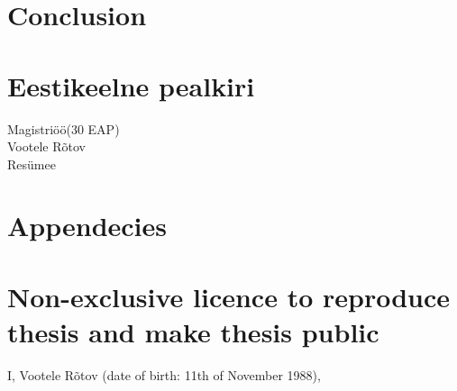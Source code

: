 \documentclass{style/master-thesis}
\begin{document}
\clearpage
\section{Conclusion} 



\newpage


\section{Eestikeelne pealkiri}
Magistriöö(30 EAP) \\
Vootele Rõtov \\
Resümee \\




\newpage

{}


\newpage

\appendix
\section*{Appendecies}
\renewcommand{\thesubsection}{\Alph{subsection}}

\pagebreak
\section*{\small Non-exclusive licence to reproduce thesis and make thesis public}


I, Vootele Rõtov (date of birth: 11th of November 1988),
\end{document}
